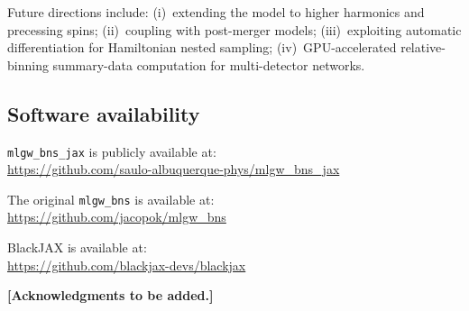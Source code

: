 \documentclass[twocolumn,superscriptaddress,nofootinbib,aps,prd]{revtex4-2}
\newcommand{\tbd}[1]{{\color{red}\textbf{[#1]}}}
\begin{document}
Future directions include: (i)~extending the model to higher harmonics and
precessing spins; (ii)~coupling with post-merger models; (iii)~exploiting
automatic differentiation for Hamiltonian nested sampling;
(iv)~GPU-accelerated relative-binning summary-data computation for
multi-detector networks.

\subsection*{Software availability}

\texttt{mlgw\_bns\_jax} is publicly available at:\\
\url{https://github.com/saulo-albuquerque-phys/mlgw_bns_jax}

\noindent The original \texttt{mlgw\_bns} is available at:\\
\url{https://github.com/jacopok/mlgw_bns}

\noindent BlackJAX is available at:\\
\url{https://github.com/blackjax-devs/blackjax}


\begin{acknowledgments}
\tbd{Acknowledgments to be added.}
\end{acknowledgments}
\end{document}
